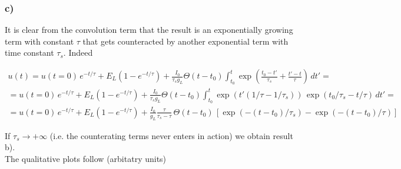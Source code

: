 \documentclass[11pt]{article}
\begin{document}
    \subsubsection*{c)}\label{c}

It is clear from the convolution term that the result is an
exponentially growing term with constant $\tau$ that gets counteracted
by another exponential term with time constant $\tau_s$. Indeed

\begin{gather*}
    u(t) = u(t=0) \, e^{-t/\tau} + E_L \left(1 - e^{-t/\tau}\right) + \frac{I_0}{\tau_s g_L} \Theta(t-t_0) \int_{t_0}^t \exp\left(\frac{t_0-t'}{\tau_s} + \frac{t'-t}{\tau}\right) \, dt' = \\
    = u(t=0) \, e^{-t/\tau} + E_L \left(1 - e^{-t/\tau}\right) + \frac{I_0}{\tau_s g_L} \Theta(t-t_0) \int_{t_0}^t \exp\left(t'(1/\tau-1/\tau_s)\right) \, \exp\left(t_0/\tau_s - t/\tau\right) \, dt' = \\
    = u(t=0) \, e^{-t/\tau} + E_L \left(1 - e^{-t/\tau}\right) + \frac{I_0}{g_L} \frac{\tau}{\tau_s - \tau} \, \Theta(t-t_0) \, \left[\exp\left(-(t-t_0)/\tau_s\right) - \exp\left(-(t-t_0)/\tau\right)\right]
\end{gather*}

If $\tau_s \to +\infty$ (i.e. the counterating terms never enters in
action) we obtain result b).\\The qualitative plots follow (arbitatry
units)
\end{document}
